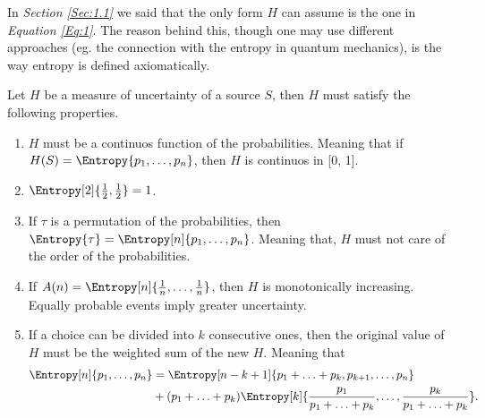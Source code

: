 \documentclass{subfiles}
\begin{document}
    In \emph{Section \ref{Sec:1.1}} we said that the only form \(H\) can 
    assume is the one in \emph{Equation \eqref{Eq:1}}. 
    The reason behind this, though one may use different approaches 
        (eg. the connection with the entropy in quantum mechanics), 
        is the way entropy is defined axiomatically. 

    \begin{axiom*}
        Let \(H\) be a measure of uncertainty of a source \(S\), 
            then \(H\) must satisfy the following properties.
        \begin{enumerate}
            \item \(H\) must be a continuos function of the probabilities.
                Meaning that if \(H(S) = \Entropy{p_{1}, \ldots, p_{n}}\), 
                then \(H\) is continuos in [0, 1].

            \item \(\Entropy[2]{\tfrac{1}{2}, \tfrac{1}{2}} = 1\).

            \item If \(\tau\) is a permutation of the probabilities, 
                then \(\Entropy{\tau} = \Entropy[n]{p_{1}, \ldots, p_{n}}\). 
                Meaning that, \(H\) must not care of the order of the probabilities.

            \item If \(A(n) = \Entropy[n]{\tfrac{1}{n}, \ldots, \tfrac{1}{n}}\),
                then \(H\) is monotonically increasing.
                Equally probable events imply greater uncertainty.

            \item If a choice can be divided into \(k\) consecutive ones,
                then the original value of \(H\) must be the weighted sum of the new \(H\).
                Meaning that
                \[\begin{aligned}
                    \Entropy[n]{p_{1}, \ldots, p_{n}} & = 
                        \Entropy[n - k + 1]{
                            p_{1} + \ldots + p_{k}, p_{k + 1}, \ldots, p_{n}
                        } \\ 
                        & + (p_{1} + \ldots + p_{k})
                            \Entropy[k]{
                                \frac{p_{1}}{p_{1} + \ldots + p_{k}},
                                \ldots,
                                \frac{p_{k}}{p_{1} + \ldots + p_{k}}
                            }.
                \end{aligned}\]
       \end{enumerate}
    \end{axiom*} 
\end{document}
